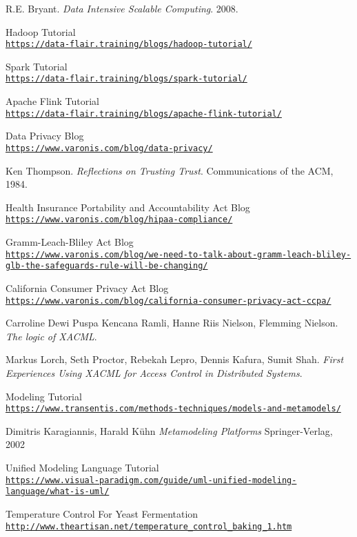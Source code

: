 \begin{thebibliography}{9}
R.E. Bryant.
\textit{Data Intensive Scalable Computing}. 
2008.

Hadoop Tutorial
\\\texttt{\url{https://data-flair.training/blogs/hadoop-tutorial/}}

Spark Tutorial
\\\texttt{\url{https://data-flair.training/blogs/spark-tutorial/}}

Apache Flink Tutorial
\\\texttt{\url{https://data-flair.training/blogs/apache-flink-tutorial/}}

Data Privacy Blog
\\\texttt{\url{https://www.varonis.com/blog/data-privacy/}}

Ken Thompson.
\textit{Reflections on Trusting Trust}. 
Communications of the ACM, 1984.

Health Insurance Portability and Accountability Act Blog
\\\texttt{\url{https://www.varonis.com/blog/hipaa-compliance/}}

Gramm-Leach-Bliley Act Blog
\\\texttt{\url{https://www.varonis.com/blog/we-need-to-talk-about-gramm-leach-bliley-glb-the-safeguards-rule-will-be-changing/}}

California Consumer Privacy Act Blog
\\\texttt{\url{https://www.varonis.com/blog/california-consumer-privacy-act-ccpa/}}

Carroline Dewi Puspa Kencana Ramli, Hanne Riis Nielson, Flemming Nielson.
\textit{The logic of XACML}.

Markus Lorch, Seth Proctor, Rebekah Lepro, Dennis Kafura, Sumit Shah.
\textit{First Experiences Using XACML for Access Control in Distributed Systems}.

Modeling Tutorial
\\\texttt{\url{https://www.transentis.com/methods-techniques/models-and-metamodels/}}

Dimitris Karagiannis, Harald Kühn
\textit{Metamodeling Platforms}
Springer-Verlag, 2002

Unified Modeling Language Tutorial
\\\texttt{\url{https://www.visual-paradigm.com/guide/uml-unified-modeling-language/what-is-uml/}}

Temperature Control For Yeast Fermentation
\\\texttt{\url{http://www.theartisan.net/temperature\_control\_baking\_1.htm}}


\end{thebibliography}
